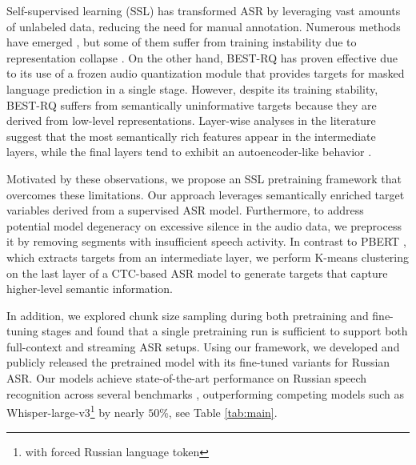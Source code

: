 \documentclass{Interspeech}
\begin{document}
Self-supervised learning (SSL) has transformed ASR by leveraging vast amounts of unlabeled data, reducing the need for manual annotation. Numerous methods have emerged \cite{hubert, wavlm, bestrq, pbert, wav2vec2, wav2vec, data2vec}, but some of them suffer from training instability due to representation collapse \cite{hubert, wav2vec2, data2vec}. On the other hand, BEST-RQ \cite{bestrq} has proven effective due to its use of a frozen audio quantization module that provides targets for masked language prediction in a single stage. However, despite its training stability, BEST-RQ suffers from semantically uninformative targets because they are derived from low-level representations. Layer-wise analyses in the literature suggest that the most semantically rich features appear in the intermediate layers, while the final layers tend to exhibit an autoencoder-like behavior \cite{layer_analysis, best_rq_autoencoder}.



Motivated by these observations, we propose an SSL pretraining framework that overcomes these limitations. Our approach leverages semantically enriched target variables derived from a supervised ASR model. Furthermore, to address potential model degeneracy on excessive silence in the audio data, we preprocess it by removing segments with insufficient speech activity. In contrast to PBERT \cite{pbert}, which extracts targets from an intermediate layer, we perform K-means clustering on the last layer of a CTC-based ASR model \cite{ctcloss} to generate targets that capture higher-level semantic information.

In addition, we explored chunk size sampling during both pretraining and fine-tuning stages and found that a single pretraining run is sufficient to support both full-context and streaming ASR setups.
Using our framework, we developed and publicly released the pretrained model with its fine-tuned variants for Russian ASR. Our models achieve state-of-the-art performance on Russian speech recognition across several benchmarks \cite{golos, mcv, ruls}, outperforming competing models such as Whisper-large-v3\footnote{with forced Russian language token} by nearly $50$\%, see Table \ref{tab:main}.
\end{document}
